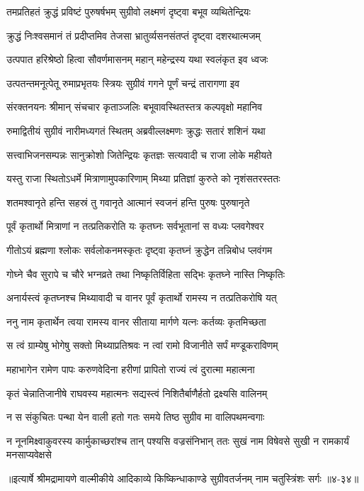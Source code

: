 
\twolineshloka
{तमप्रतिहतं क्रुद्धं प्रविष्टं पुरुषर्षभम्}
{सुग्रीवो लक्ष्मणं दृष्ट्वा बभूव व्यथितेन्द्रियः} %

\twolineshloka
{क्रुद्धं निःश्वसमानं तं प्रदीप्तमिव तेजसा}
{भ्रातुर्व्यसनसंतप्तं दृष्ट्वा दशरथात्मजम्} %

\twolineshloka
{उत्पपात हरिश्रेष्ठो हित्वा सौवर्णमासनम्}
{महान् महेन्द्रस्य यथा स्वलंकृत इव ध्वजः} %

\twolineshloka
{उत्पतन्तमनूत्पेतू रुमाप्रभृतयः स्त्रियः}
{सुग्रीवं गगने पूर्णं चन्द्रं तारागणा इव} %

\twolineshloka
{संरक्तनयनः श्रीमान् संचचार कृताञ्जलिः}
{बभूवावस्थितस्तत्र कल्पवृक्षो महानिव} %

\twolineshloka
{रुमाद्वितीयं सुग्रीवं नारीमध्यगतं स्थितम्}
{अब्रवील्लक्ष्मणः क्रुद्धः सतारं शशिनं यथा} %

\twolineshloka
{सत्त्वाभिजनसम्पन्नः सानुक्रोशो जितेन्द्रियः}
{कृतज्ञः सत्यवादी च राजा लोके महीयते} %

\twolineshloka
{यस्तु राजा स्थितोऽधर्मे मित्राणामुपकारिणाम्}
{मिथ्या प्रतिज्ञां कुरुते को नृशंसतरस्ततः} %

\twolineshloka
{शतमश्वानृते हन्ति सहस्रं तु गवानृते}
{आत्मानं स्वजनं हन्ति पुरुषः पुरुषानृते} %

\twolineshloka
{पूर्वं कृतार्थो मित्राणां न तत्प्रतिकरोति यः}
{कृतघ्नः सर्वभूतानां स वध्यः प्लवगेश्वर} %

\twolineshloka
{गीतोऽयं ब्रह्मणा श्लोकः सर्वलोकनमस्कृतः}
{दृष्ट्वा कृतघ्नं क्रुद्धेन तन्निबोध प्लवंगम} %

\twolineshloka
{गोघ्ने चैव सुरापे च चौरे भग्नव्रते तथा}
{निष्कृतिर्विहिता सद्भिः कृतघ्ने नास्ति निष्कृतिः} %

\twolineshloka
{अनार्यस्त्वं कृतघ्नश्च मिथ्यावादी च वानर}
{पूर्वं कृतार्थो रामस्य न तत्प्रतिकरोषि यत्} %

\twolineshloka
{ननु नाम कृतार्थेन त्वया रामस्य वानर}
{सीताया मार्गणे यत्नः कर्तव्यः कृतमिच्छता} %

\twolineshloka
{स त्वं ग्राम्येषु भोगेषु सक्तो मिथ्याप्रतिश्रवः}
{न त्वां रामो विजानीते सर्पं मण्डूकराविणम्} %

\twolineshloka
{महाभागेन रामेण पापः करुणवेदिना}
{हरीणां प्रापितो राज्यं त्वं दुरात्मा महात्मना} %

\twolineshloka
{कृतं चेन्नातिजानीषे राघवस्य महात्मनः}
{सद्यस्त्वं निशितैर्बाणैर्हतो द्रक्ष्यसि वालिनम्} %

\twolineshloka
{न स संकुचितः पन्था येन वाली हतो गतः}
{समये तिष्ठ सुग्रीव मा वालिपथमन्वगाः} %

\twolineshloka
{न नूनमिक्ष्वाकुवरस्य कार्मुकाच्छरांश्च तान् पश्यसि वज्रसंनिभान्}
{ततः सुखं नाम विषेवसे सुखी न रामकार्यं मनसाप्यवेक्षसे} %


॥इत्यार्षे श्रीमद्रामायणे वाल्मीकीये आदिकाव्ये किष्किन्धाकाण्डे सुग्रीवतर्जनम् नाम चतुस्त्रिंशः सर्गः ॥४-३४॥
